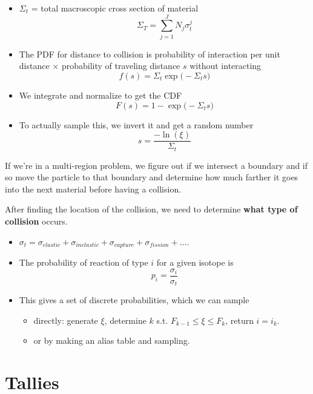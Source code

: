 \documentclass[12pt]{article}
\begin{document}
\begin{itemize}
\item $\Sigma_t$ = total macroscopic cross section of material
\[\Sigma_T = \sum_{j=1}^J N_j \sigma_t^j\]

\item The PDF for distance to collision is probability of interaction per unit distance $\times$ probability of traveling distance $s$ without interacting
\[f(s) = \Sigma_t \exp\bigl(-\Sigma_t s \bigr)\]

\item We integrate and normalize to get the CDF
\[F(s) = 1 - \exp\bigl(-\Sigma_t s \bigr)\]

\item To actually sample this, we invert it and get a random number
\[s = \frac{-\ln(\xi)}{\Sigma_t}\]
\end{itemize}
%
If we're in a multi-region problem, we figure out if we intersect a boundary and if so move the particle to that boundary and determine how much farther it goes into the next material before having a collision.

After finding the location of the collision, we need to determine \textbf{what type of collision} occurs. 

\begin{itemize}
\item $\sigma_t = \sigma_{elastic} + \sigma_{inelastic} + \sigma_{capture} + \sigma_{fission} + \dots$.

\item The probability of reaction of type $i$ for a given isotope is 
\[p_i = \frac{\sigma_i}{\sigma_t}\]

\item This gives a set of discrete probabilities, which we can sample 
\begin{itemize}
\item directly: generate $\xi$, determine $k$ s.t. $F_{k-1} \leq \xi \le F_k$, return $i = i_k$.

\item or by making an alias table and sampling.
\end{itemize}

\end{itemize}


\section{Tallies}
\end{document}
